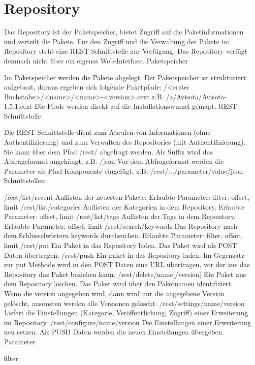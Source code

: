 \section[sec:repository]{Repository}

Das Repository ist der Paketspeicher, bietet Zugriff auf die Paketinformationen und verteilt die Pakete. Für den Zugriff und die Verwaltung der Pakete im Repository steht eine REST Schnittstelle zur Verfügung. Das Repository verfügt demnach nicht über ein eigenes Web-Interface.
Paketspeicher

Im Paketspeicher werden die Pakete abgelegt. Der Paketspeicher ist strukturiert aufgebaut, daraus ergeben sich folgende Paketpfade:
/<erster Buchstabe>/<name>/<name>-<version>.cext
z.B.
/a/Avisota/Avisota-1.5.1.cext
Die Pfade werden direkt auf die Installationswurzel gemapt.
REST Schnittstelle

Die REST Schnittstelle dient zum Abrufen von Informationen (ohne Authentifizierung) und zum Verwalten des Repositories (mit Authentifizierung).
Sie kann über dem Pfad /rest/ abgefragt werden.
Als Suffix wird das Abfrageformat angehängt, z.B. /json
Vor dem Abfrageformat werden die Parameter als Pfad-Komponente eingefügt, z.B. /rest/.../parameter/value/json
Schnittstellen

/rest/list/recent
Auflisten der neuesten Pakete.
Erlaubte Parameter: filter, offset, limit
/rest/list/categories
Auflisten der Kategorien in dem Repository.
Erlaubte Parameter: offset, limit
/rest/list/tags
Auflisten der Tags in dem Repository.
Erlaubte Parameter: offset, limit
/rest/search/keywords
Das Repository nach dem Schlüsselwörtern keywords durchsuchen.
Erlaubte Parameter: filter, offset, limit
/rest/put
Ein Paket in das Repository laden. Das Paket wird als POST Daten übertragen.
/rest/push
Ein paket in das Repository laden. Im Gegensatz zur put Methode wird in den POST Daten eine URL übertragen, vor der aus das Repository das Paket beziehen kann.
/rest/delete/name[/version]
Ein Paket aus dem Repository löschen. Das Paket wird über den Paketnamen identifiziert. Wenn die version angegeben wird, dann wird nur die angegebene Version gelöscht, ansonsten werden alle Versionen gelöscht.
/rest/settings/name/version
Liefert die Einstellungen (Kategorie, Veröffentlichung, Zugriff) einer Erweiterung im Repository.
/rest/configure/name/version
Die Einstellungen einer Erweiterung neu setzen. Als PUSH Daten werden die neuen Einstellungen übergeben.
Parameter

filter

